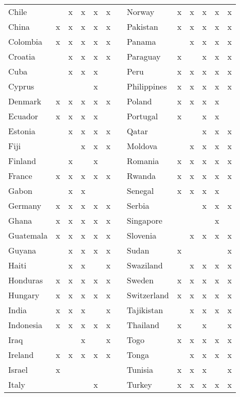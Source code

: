 \begin{table}[ht!]
\begin{center}
{\begin{tabular}{l c c c c c c l c c c c c}
Chile	&		&	x	&	x	&	x	&	x	&	&	Norway	&	x	&	x	&	x	&	x	&	x	\\
China	&	x	&	x	&	x	&	x	&	x	&	&	Pakistan	&	x	&	x	&	x	&	x	&	x	\\
Colombia	&	x	&	x	&	x	&	x	&	x	&	&	Panama	&		&	x	&	x	&	x	&	x	\\
Croatia	&		&	x	&	x	&	x	&	x	&	&	Paraguay	&	x	&		&	x	&	x	&	x	\\
Cuba	&		&	x	&	x	&	x	&		&	&	Peru	&	x	&	x	&	x	&	x	&	x	\\
Cyprus	&		&		&		&	x	&		&	&	Philippines	&	x	&	x	&	x	&	x	&	x	\\
Denmark	&	x	&	x	&	x	&	x	&	x	&	&	Poland	&	x	&	x	&	x	&	x	&		\\
Ecuador	&	x	&	x	&	x	&	x	&		&	&	Portugal	&	x	&		&	x	&	x	&		\\
Estonia	&		&	x	&	x	&	x	&	x	&	&	Qatar	&		&		&	x	&	x	&	x	\\
Fiji	&		&		&	x	&	x	&	x	&	&	Moldova	&		&	x	&	x	&	x	&	x	\\
Finland	&		&	x	&		&	x	&		&	&	Romania	&	x	&	x	&	x	&	x	&	x	\\
France	&	x	&	x	&	x	&	x	&	x	&	&	Rwanda	&	x	&	x	&	x	&	x	&	x	\\
Gabon	&		&	x	&	x	&		&		&	&	Senegal	&	x	&	x	&	x	&	x	&		\\
Germany	&	x	&	x	&	x	&	x	&	x	&	&	Serbia	&		&		&	x	&	x	&	x	\\
Ghana	&	x	&	x	&	x	&	x	&	x	&	&	Singapore	&		&		&		&	x	&		\\
Guatemala	&	x	&	x	&	x	&	x	&	x	&	&	Slovenia	&		&	x	&	x	&	x	&	x	\\
Guyana	&		&	x	&	x	&	x	&	x	&	&	Sudan	&	x	&		&		&		&	x	\\
Haiti	&		&	x	&	x	&		&	x	&	&	Swaziland	&		&	x	&	x	&	x	&	x	\\
Honduras	&	x	&	x	&	x	&	x	&	x	&	&	Sweden	&	x	&	x	&	x	&	x	&	x	\\
Hungary	&	x	&	x	&	x	&	x	&	x	&	&	Switzerland	&	x	&	x	&	x	&	x	&	x	\\
India	&	x	&	x	&	x	&		&	x	&	&	Tajikistan	&		&	x	&	x	&	x	&	x	\\
Indonesia	&	x	&	x	&	x	&	x	&	x	&	&	Thailand	&	x	&		&	x	&		&	x	\\
Iraq	&		&		&	x	&		&	x	&	&	Togo	&	x	&	x	&	x	&	x	&	x	\\
Ireland	&	x	&	x	&	x	&	x	&	x	&	&	Tonga	&		&	x	&	x	&	x	&	x	\\
Israel	&	x	&		&		&		&		&	&	Tunisia	&	x	&	x	&	x	&		&	x	\\
Italy	&		&		&		&	x	&		&	&	Turkey	&	x	&	x	&	x	&	x	&	x	\\

\end{tabular}}
\end{center}
\end{table}
